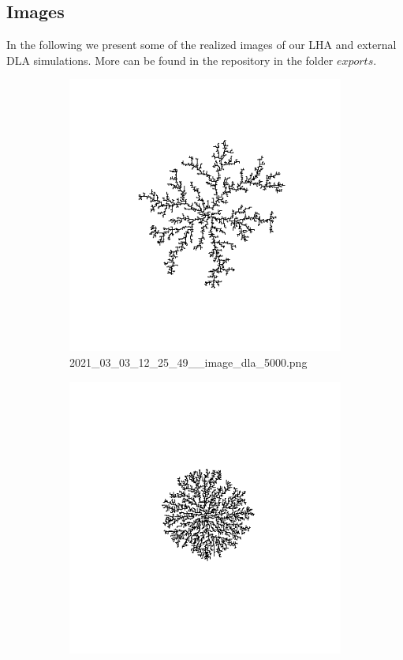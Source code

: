 \documentclass[12pt,a4paper]{scrartcl}
\newcommand{\1}{\mathbbm{1}}
\theoremstyle{definition}
\numberwithin{equation}{section}
\begin{document}
\newpage
\subsection{Images}
In the following we present some of the realized images of our LHA and external DLA simulations. More can be found in the repository in the folder $\mathit{exports}$.

\begin{figure}[h!]
	\centering
	\begin{subfigure}[b]{.49\textwidth}
		\includegraphics[width=1\linewidth]{images/ia/2021_03_03_12_25_49__image_dla_5000.png}
		\caption{2021\_03\_03\_12\_25\_49\_\_image\_dla\_5000.png}
	\end{subfigure}
	\begin{subfigure}[b]{.49\textwidth}
		\includegraphics[width=1\linewidth]{images/ia/2021_03_06_00_23_38__image_lha_5000.png}

\end{subfigure}
\end{figure}
\end{document}
